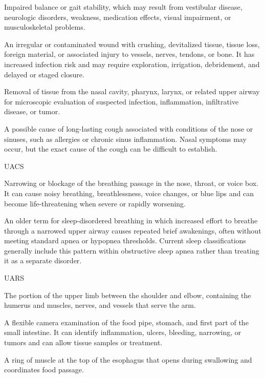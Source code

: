 Impaired balance or gait stability, which may result from vestibular disease, neurologic disorders, weakness, medication effects, visual impairment, or musculoskeletal problems.

 An irregular or contaminated wound with crushing, devitalized tissue, tissue loss, foreign material, or associated injury to vessels, nerves, tendons, or bone. It has increased infection risk and may require exploration, irrigation, debridement, and delayed or staged closure.

 Removal of tissue from the nasal cavity, pharynx, larynx, or related upper airway for microscopic evaluation of suspected infection, inflammation, infiltrative disease, or tumor.

 A possible cause of long-lasting cough associated with conditions of the nose or sinuses, such as allergies or chronic sinus inflammation. Nasal symptoms may occur, but the exact cause of the cough can be difficult to establish.

\synonyms
UACS

 Narrowing or blockage of the breathing passage in the nose, throat, or voice box. It can cause noisy breathing, breathlessness, voice changes, or blue lips and can become life-threatening when severe or rapidly worsening.

 An older term for sleep-disordered breathing in which increased effort to breathe through a narrowed upper airway causes repeated brief awakenings, often without meeting standard apnea or hypopnea thresholds. Current sleep classifications generally include this pattern within obstructive sleep apnea rather than treating it as a separate disorder.

\synonyms
UARS

 The portion of the upper limb between the shoulder and elbow, containing the humerus and muscles, nerves, and vessels that serve the arm.

 A flexible camera examination of the food pipe, stomach, and first part of the small intestine. It can identify inflammation, ulcers, bleeding, narrowing, or tumors and can allow tissue samples or treatment.

 A ring of muscle at the top of the esophagus that opens during swallowing and coordinates food passage.

